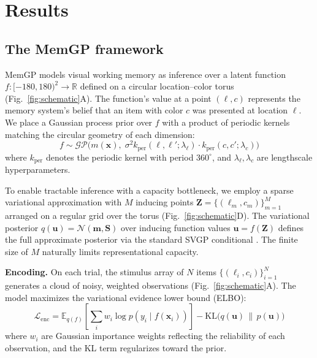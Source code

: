 \documentclass[11pt,letterpaper]{article}
\newcommand{\GP}{\mathcal{GP}}
\newcommand{\KL}{\mathrm{KL}}
\newcommand{\E}{\mathbb{E}}
\newcommand{\R}{\mathbb{R}}
\newcommand{\bx}{\mathbf{x}}
\newcommand{\bZ}{\mathbf{Z}}
\newcommand{\bu}{\mathbf{u}}
\newcommand{\bm}{\mathbf{m}}
\begin{document}
\section{Results}

\subsection{The MemGP framework}

MemGP models visual working memory as inference over a latent function $f: [-180, 180)^2 \to \R$ defined on a circular location--color torus (Fig.~\ref{fig:schematic}A). The function's value at a point $(\ell, c)$ represents the memory system's belief that an item with color $c$ was presented at location $\ell$. We place a Gaussian process prior over $f$ with a product of periodic kernels matching the circular geometry of each dimension:
\begin{equation}
    f \sim \GP\bigl(m(\bx),\; \sigma^2 k_{\mathrm{per}}(\ell, \ell'; \lambda_\ell) \cdot k_{\mathrm{per}}(c, c'; \lambda_c)\bigr)
    \label{eq:prior}
\end{equation}
where $k_{\mathrm{per}}$ denotes the periodic kernel with period $360^\circ$, and $\lambda_\ell, \lambda_c$ are lengthscale hyperparameters.

To enable tractable inference with a capacity bottleneck, we employ a sparse variational approximation with $M$ inducing points $\bZ = \{(\ell_m, c_m)\}_{m=1}^M$ arranged on a regular grid over the torus (Fig.~\ref{fig:schematic}D). The variational posterior $q(\bu) = \mathcal{N}(\bm, \mathbf{S})$ over inducing function values $\bu = f(\bZ)$ defines the full approximate posterior via the standard SVGP conditional \cite{tiaoHandbookSparseVariational2019}. The finite size of $M$ naturally limits representational capacity.

\textbf{Encoding.} On each trial, the stimulus array of $N$ items $\{(\ell_i, c_i)\}_{i=1}^N$ generates a cloud of noisy, weighted observations (Fig.~\ref{fig:schematic}A). The model maximizes the variational evidence lower bound (ELBO):
\begin{equation}
    \mathcal{L}_{\mathrm{enc}} = \E_{q(f)}\!\left[\sum_i w_i \log p(y_i \mid f(\bx_i))\right] - \KL\bigl(q(\bu) \,\|\, p(\bu)\bigr)
    \label{eq:elbo_enc}
\end{equation}
where $w_i$ are Gaussian importance weights reflecting the reliability of each observation, and the KL term regularizes toward the prior.
\end{document}
